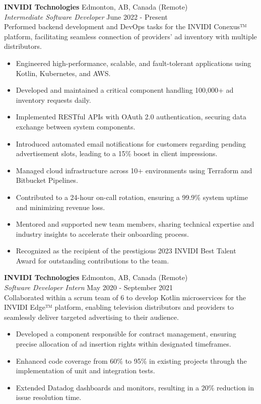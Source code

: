 \documentclass[a4paper]{article}
\begin{document}
\textbf{INVIDI Technologies} \hfill Edmonton, AB, Canada (Remote)\\
\textit{Intermediate Software Developer} \hfill June 2022 - Present \\
Performed backend development and DevOps tasks for the INVIDI Conexus™ platform, facilitating seamless connection of providers' ad inventory with multiple distributors.
\vspace{-1mm}
\begin{itemize} \itemsep 1pt
	\item Engineered high-performance, scalable, and fault-tolerant applications using Kotlin, Kubernetes, and AWS.
    \item Developed and maintained a critical component handling 100,000+ ad inventory requests daily.
    \item Implemented RESTful APIs with OAuth 2.0 authentication, securing data exchange between system components.
	\item Introduced automated email notifications for customers regarding pending advertisement slots, leading to a 15\% boost in client impressions.
    \item Managed cloud infrastructure across 10+ environments using Terraform and Bitbucket Pipelines.
    \item Contributed to a 24-hour on-call rotation, ensuring a 99.9\% system uptime and minimizing revenue loss.
    \item Mentored and supported new team members, sharing technical expertise and industry insights to accelerate their onboarding process.
    \item Recognized as the recipient of the prestigious 2023 INVIDI Best Talent Award for outstanding contributions to the team.
\end{itemize}
\vspace{1mm}

\textbf{INVIDI Technologies} \hfill Edmonton, AB, Canada (Remote)\\
\textit{Software Developer Intern} \hfill May 2020 - September 2021\\
Collaborated within a scrum team of 6 to develop Kotlin microservices for the INVIDI Edge™ platform, enabling television distributors and providers to seamlessly deliver targeted advertising to their audience.
\vspace{-1mm}
\begin{itemize} \itemsep 1pt
    \item Developed a component responsible for contract management, ensuring precise allocation of ad insertion rights within designated timeframes.
	\item Enhanced code coverage from 60\% to 95\% in existing projects through the implementation of unit and integration tests.
	\item Extended Datadog dashboards and monitors, resulting in a 20\% reduction in issue resolution time.
\end{itemize}
\end{document}
